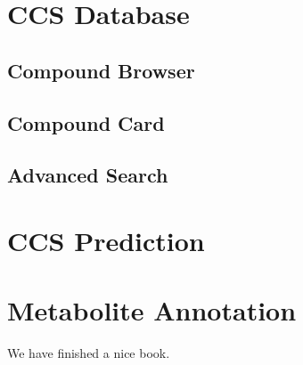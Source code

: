 \documentclass[12pt,]{book}
\begin{document}
\chapter{CCS Database}\label{ccsdb}

\section{Compound Browser}\label{compound-browser}

\section{Compound Card}\label{compound-card}

\section{Advanced Search}\label{advanced-search}

\chapter{CCS Prediction}\label{ccsprediction}

\chapter{Metabolite Annotation}\label{metannotation}

We have finished a nice book.


\end{document}
